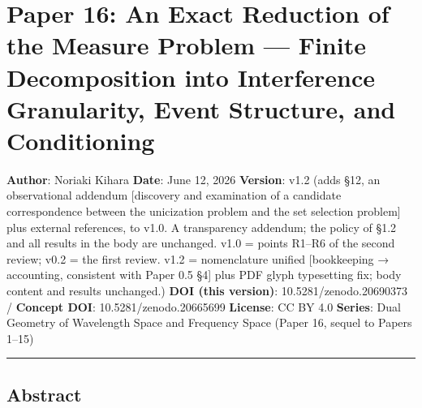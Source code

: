 \documentclass[
]{ltjsarticle}
\author{}
\date{}
\begin{document}
\section{Paper 16: An Exact Reduction of the Measure Problem --- Finite
Decomposition into Interference Granularity, Event Structure, and
Conditioning}\label{paper-16-an-exact-reduction-of-the-measure-problem-finite-decomposition-into-interference-granularity-event-structure-and-conditioning}

\textbf{Author}: Noriaki Kihara \textbf{Date}: June 12, 2026
\textbf{Version}: v1.2 (adds §12, an observational addendum {[}discovery
and examination of a candidate correspondence between the unicization
problem and the set selection problem{]} plus external references, to
v1.0. A transparency addendum; the policy of §1.2 and all results in the
body are unchanged. v1.0 = points R1--R6 of the second review; v0.2 =
the first review. v1.2 = nomenclature unified {[}bookkeeping →
accounting, consistent with Paper 0.5 §4{]} plus PDF glyph typesetting
fix; body content and results unchanged.) \textbf{DOI (this version)}:
10.5281/zenodo.20690373 / \textbf{Concept DOI}: 10.5281/zenodo.20665699
\textbf{License}: CC BY 4.0 \textbf{Series}: Dual Geometry of Wavelength
Space and Frequency Space (Paper 16, sequel to Papers 1--15)

\begin{center}\rule{0.5\linewidth}{0.5pt}\end{center}

\subsection{Abstract}\label{abstract}
\end{document}

